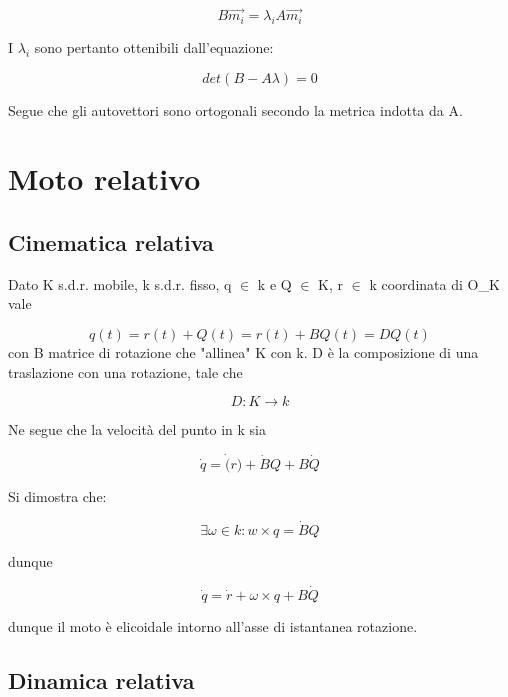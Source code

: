 \documentclass{article}
\begin{document}
        \begin{equation}
            B \vec{m_i}=\lambda_iA\vec{m_i}
        \end{equation}

        I $\lambda_i$ sono pertanto ottenibili dall'equazione:

        \begin{equation}
            det(B-A\lambda)=0
        \end{equation}

        Segue che gli autovettori sono ortogonali secondo la metrica indotta da A.

        \section{Moto relativo}
        \subsection{Cinematica relativa}
        Dato K s.d.r. mobile, k s.d.r. fisso, q $\in$ k e Q $\in$ K, r $\in$ k coordinata di O\_K vale

\begin{equation}
    q(t)=r(t)+Q(t)= r(t)+ BQ(t)= DQ(t)
\end{equation}
con B matrice di rotazione che "allinea" K con k. D è la composizione di una traslazione con una rotazione, tale che

\begin{equation}
    D: K \rightarrow k
\end{equation}

Ne segue che la velocità del punto in k sia

\begin{equation}
    \dot{q}= \dot(r)+\dot{B}Q+ B\dot{Q}
\end{equation}

Si dimostra che:

\begin{equation}
    \exists \omega \in k : w \times q= \dot{B}Q
\end{equation}

dunque

\begin{equation}
    \dot{q}= \dot{r}+\omega \times q+ B\dot{Q}
\end{equation}

dunque il moto è elicoidale intorno all'asse di istantanea rotazione.

\subsection{Dinamica relativa}
\end{document}
